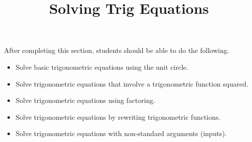 \documentclass{ximera}
\title{Solving Trig Equations}
\begin{document}
\begin{abstract} 
\end{abstract}

\maketitle

\begin{sectionOutcomes}
After completing this section, students should be able to do the following.

\begin{itemize}
	\item Solve basic trigonometric equations using the unit circle.
    \item Solve trigonometric equations that involve a trigonometric function squared. 
    \item Solve trigonometric equations using factoring.
    \item Solve trigonometric equations by rewriting trigonometric functions.
    \item Solve trigonometric equations with non-standard arguments (inputs). 

\end{itemize}
\end{sectionOutcomes}
\end{document}
